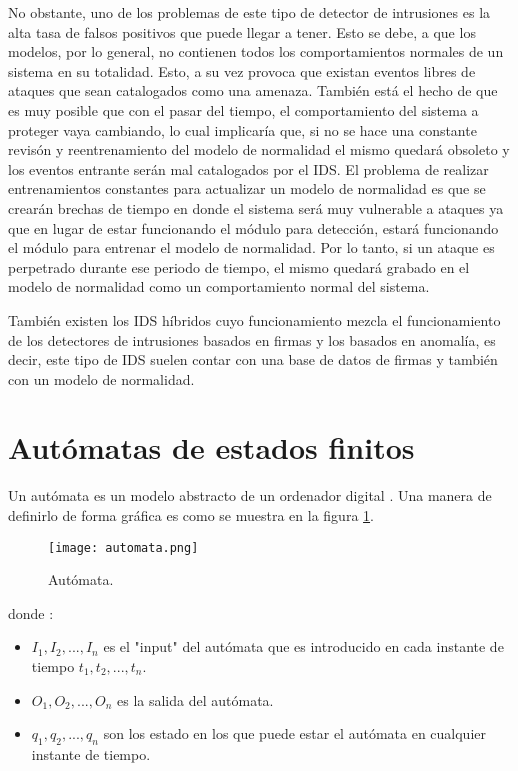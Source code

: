 No obstante, uno de los problemas de este tipo de detector de intrusiones es la alta tasa de falsos positivos que puede llegar a tener. Esto se debe, a que los modelos, por lo general, no contienen todos los comportamientos normales de un sistema en su totalidad. Esto, a su vez provoca que existan eventos libres de ataques que sean catalogados como una amenaza. Tambi\'en está el hecho de que es muy posible que con el pasar del tiempo, el comportamiento del sistema a proteger vaya cambiando, lo cual implicar\'ia que, si no se hace una constante revis\'on y reentrenamiento del modelo de normalidad el mismo quedar\'a obsoleto y los eventos entrante ser\'an mal catalogados por el IDS. El problema de realizar entrenamientos constantes para actualizar un modelo de normalidad es que se crearán brechas de tiempo en donde el sistema ser\'a muy vulnerable a ataques ya que en lugar de estar funcionando el módulo para detección, estar\'a funcionando el módulo para entrenar el modelo de normalidad. Por lo tanto, si un ataque es perpetrado durante ese periodo de tiempo, el mismo quedar\'a grabado en el modelo de normalidad como un comportamiento normal del sistema.

También existen los IDS híbridos cuyo funcionamiento mezcla el funcionamiento de los detectores de intrusiones basados en firmas y los basados en anomalía, es decir, este tipo de  IDS suelen contar con una base de datos de firmas y también con un modelo de normalidad.

\section{Autómatas de estados finitos}

Un autómata es un modelo abstracto de un ordenador digital \cite{automata}. Una manera de definirlo de forma gráfica es como se muestra en la figura \ref{fig:automata}.

\begin{figure}[H]
\begin{center}
\texttt{[image: automata.png]}
\caption{Autómata.\cite{automata2}}
\label{fig:automata}
\end{center}
\end{figure}

donde \cite{automata2}:

\begin{itemize}
\item  $I_{1}, I_{2},..., I_{n}$ es el "input" del autómata  que es introducido en cada instante de tiempo $t_{1}, t_{2},..., t_{n}$.

\item $O_{1}, O_{2},..., O_{n}$ es la salida del autómata.

\item $q_{1}, q_{2},..., q_{n}$ son los estado en los que puede estar el autómata en cualquier instante de tiempo.
\end{itemize}

